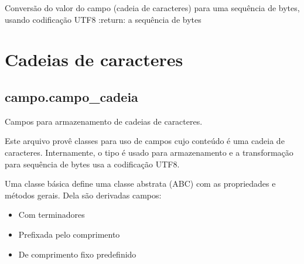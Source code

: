 \documentclass[letterpaper,10pt,brazil]{sphinxmanual}
\begin{document}
\begin{fulllineitems}

\begin{fulllineitems}
\label{\detokenize{index:estrutarq.campo.campo_comum.CampoBruto.valor_para_bytes}}
\pysigstartsignatures
{}
\pysigstopsignatures
\sphinxAtStartPar
Conversão do valor do campo (cadeia de caracteres) para uma
sequência de bytes, usando codificação UTF\sphinxhyphen{}8
:return: a sequência de bytes

\end{fulllineitems}


\end{fulllineitems}



\section{Cadeias de caracteres}
\label{\detokenize{index:module-estrutarq.campo.campo_cadeia}}\label{\detokenize{index:cadeias-de-caracteres}}

\subsection{campo.campo\_cadeia}
\label{\detokenize{index:campo-campo-cadeia}}
\sphinxAtStartPar
Campos para armazenamento de cadeias de caracteres.

\sphinxAtStartPar
Este arquivo provê classes para uso de campos cujo conteúdo é
uma cadeia de caracteres. Internamente, o tipo  é usado
para armazenamento e a transformação para sequência de bytes
usa a codificação UTF\sphinxhyphen{}8.

\sphinxAtStartPar
Uma classe básica {\hyperref[\detokenize{index:estrutarq.campo.campo_cadeia.CampoCadeiaBasico}]{}} define uma classe
abstrata (ABC) com as propriedades e métodos gerais. Dela são
derivadas campos:
\begin{itemize}
\item {} 
\sphinxAtStartPar
Com terminadores

\item {} 
\sphinxAtStartPar
Prefixada pelo comprimento

\item {} 
\sphinxAtStartPar
De comprimento fixo predefinido

\end{itemize}
\end{document}
